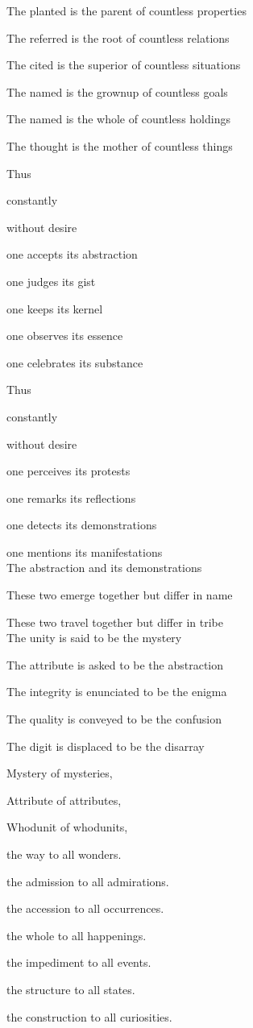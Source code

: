 \documentclass[12pt,a4paper,oneside]{book}
\begin{document}
{The planted is the parent of countless properties

The referred is the root of countless relations

The cited is the superior of countless situations

The named is the grownup of countless goals

The named is the whole of countless holdings

The thought is the mother of countless things
\linebreak

Thus

constantly 

without desire

one accepts its abstraction

one judges its gist

one keeps its kernel

one observes its essence

one celebrates its substance
\linebreak

Thus

constantly

without desire

one perceives its protests

one remarks its reflections

one detects its demonstrations

one mentions its manifestations
 \pagebreak \\
The abstraction and its demonstrations

These two emerge together but differ in name

These two travel together but differ in tribe
 \linebreak \\
The unity is said to be the mystery

The attribute is asked to be the abstraction

The integrity is enunciated to be the enigma

The quality is conveyed to be the confusion

The digit is displaced to be the disarray
\linebreak 
 
Mystery of mysteries,

Attribute of attributes,

Whodunit of whodunits,
\linebreak

the way to all wonders.

the admission to all admirations.

the accession to all occurrences.

the whole to all happenings.

the impediment to all events.

the structure to all states.

the construction to all curiosities.
}
\end{document}

